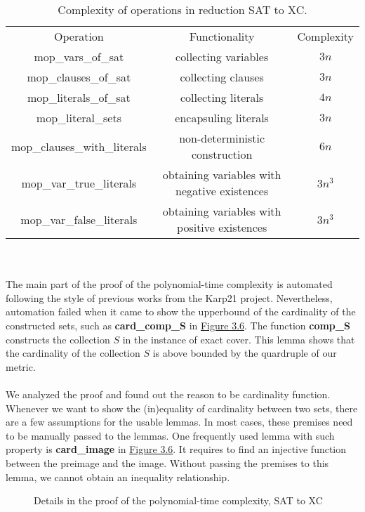 \begin{table}[!h]
    \centering 
    \begin{tabular}{| c | c | c |}
        \hline 
        Operation & Functionality & Complexity \\ 
        \hhline{|=|=|=|}
        mop\_vars\_of\_sat & collecting variables & $3n$ \\ 
        \hline 
        mop\_clauses\_of\_sat & collecting clauses & $3n$ \\ 
        \hline 
        mop\_literals\_of\_sat & collecting literals & $4n$ \\ 
        \hline 
        mop\_literal\_sets & encapsuling literals & $3n$ \\
        \hline 
        mop\_clauses\_with\_literals & non-deterministic construction & $6n$ \\ 
        \hline 
        mop\_var\_true\_literals & obtaining variables with negative existences & $3n^3$ \\ 
        \hline
        mop\_var\_false\_literals & obtaining variables with positive existences & $3n^3$ \\ 
        \hline
    \end{tabular}
    \caption{Complexity of operations in reduction SAT to XC.}
    \label{table:3.1}
\end{table}
\\\\
The main part of the proof of the polynomial-time complexity is automated following 
the style of previous works from the Karp21 project. 
Nevertheless, automation failed 
when it came to show the upperbound of the cardinality of the constructed sets, such as 
\textbf{card\_comp\_S} in \hyperref[fig:3.6]{Figure 3.6}. The function \textbf{comp\_S}
constructs the collection $S$ in the instance of exact cover. This lemma shows that 
the cardinality of the collection $S$ is above bounded by the quardruple of our metric.
\\\\
We analyzed the proof and found out the reason to be cardinality function. 
Whenever we want to show the (in)equality of cardinality between two sets, there are a few assumptions 
for the usable lemmas.
In most cases, these premises need to be manually passed to the lemmas. One frequently used lemma 
with such property is \textbf{card\_image} in \hyperref[fig:3.6]{Figure 3.6}. It requires to find 
an injective function between the preimage and the image. 
Without passing the premises to this lemma, we cannot obtain an inequality relationship.
\begin{figure}
    \centering
    \caption{Details in the proof of the polynomial-time complexity, SAT to XC}
    \label{fig:3.6}
\end{figure}

